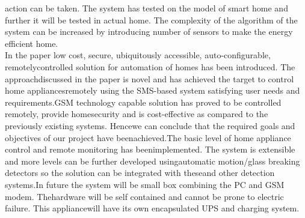 \documentclass[twoside,a4paper,16pt]{book}
\begin{document}
{{			action can be taken.
			The system has tested on the model of smart home and further it will be tested in actual
			home. The complexity of the algorithm of the system can be increased by introducing number
			of sensors to make the energy efficient home.
			\\
			In the paper low cost, secure, ubiquitously accessible, auto-configurable, remotelycontrolled solution for automation of homes has been introduced. The approachdiscussed in the paper is novel and has achieved the target to control home appliancesremotely using the SMS-based system satisfying user needs and requirements.GSM technology capable solution has proved to be controlled remotely, provide homesecurity and is cost-effective as compared to the previously existing systems. Hencewe can conclude that the required goals and objectives of our project have beenachieved.The basic level of home appliance control and remote monitoring has beenimplemented. The system is extensible and more levels can be further developed usingautomatic motion/glass breaking detectors so the solution can be integrated with theseand other detection systems.In future the system will be small box combining the PC and GSM modem. Thehardware will be self contained and cannot be prone to electric failure. This appliancewill have its own encapsulated UPS and charging system.
}}
\end{document}
